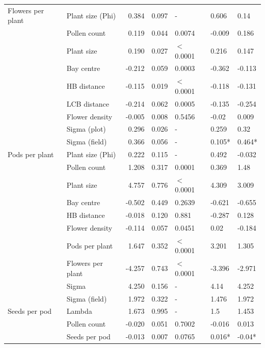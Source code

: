 \documentclass[12pt]{article} %
\begin{document}
\begin{longtable}{l|l|r|r|l|l|l}
\cline{2-7}
\multirow{-5}{*}{\raggedright\arraybackslash Flowers per plant} & Plant size (Phi) & 0.384 & 0.097 & - & 0.606 & 0.14\\
\cline{1-7}
 & Pollen count & 0.119 & 0.044 & 0.0074 & -0.009 & 0.186\\
\cline{2-7}
 & Plant size & 0.190 & 0.027 & $<$0.0001 & 0.216 & 0.147\\
\cline{2-7}
 & Bay centre & -0.212 & 0.059 & 0.0003 & -0.362 & -0.113\\
\cline{2-7}
 & HB distance & -0.115 & 0.019 & $<$0.0001 & -0.118 & -0.131\\
\cline{2-7}
 & LCB distance & -0.214 & 0.062 & 0.0005 & -0.135 & -0.254\\
\cline{2-7}
 & Flower density & -0.005 & 0.008 & 0.5456 & -0.02 & 0.009\\
\cline{2-7}
 & Sigma (plot) & 0.296 & 0.026 & - & 0.259 & 0.32\\
\cline{2-7}
 & Sigma (field) & 0.366 & 0.056 & - & 0.105* & 0.464*\\
\cline{2-7}
\multirow{-9}{*}{\raggedright\arraybackslash Pods per plant} & Plant size (Phi) & 0.222 & 0.115 & - & 0.492 & -0.032\\
\cline{1-7}
 & Pollen count & 1.208 & 0.317 & 0.0001 & 0.369 & 1.48\\
\cline{2-7}
 & Plant size & 4.757 & 0.776 & $<$0.0001 & 4.309 & 3.009\\
\cline{2-7}
 & Bay centre & -0.502 & 0.449 & 0.2639 & -0.621 & -0.655\\
\cline{2-7}
 & HB distance & -0.018 & 0.120 & 0.881 & -0.287 & 0.128\\
\cline{2-7}
 & Flower density & -0.114 & 0.057 & 0.0451 & 0.02 & -0.184\\
\cline{2-7}
 & Pods per plant & 1.647 & 0.352 & $<$0.0001 & 3.201 & 1.305\\
\cline{2-7}
 & Flowers per plant & -4.257 & 0.743 & $<$0.0001 & -3.396 & -2.971\\
\cline{2-7}
 & Sigma & 4.250 & 0.156 & - & 4.14 & 4.252\\
\cline{2-7}
 & Sigma (field) & 1.972 & 0.322 & - & 1.476 & 1.972\\
\cline{2-7}
\multirow{-10}{*}{\raggedright\arraybackslash Seeds per pod} & Lambda & 1.673 & 0.995 & - & 1.5 & 1.453\\
\cline{1-7}
 & Pollen count & -0.020 & 0.051 & 0.7002 & -0.016 & 0.013\\
\cline{2-7}
 & Seeds per pod & -0.013 & 0.007 & 0.0765 & 0.016* & -0.04*\\

\end{longtable}
\end{document}

